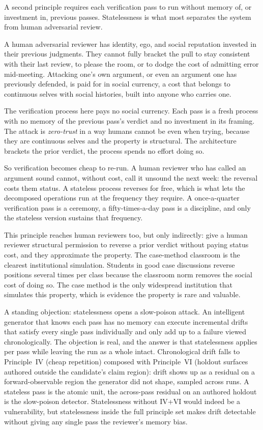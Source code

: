 \documentclass[
  11pt,
]{article}
\begin{document}
A second principle requires each verification pass to run without memory
of, or investment in, previous passes. Statelessness is what most
separates the system from human adversarial review.

A human adversarial reviewer has identity, ego, and social reputation
invested in their previous judgments. They cannot fully bracket the pull
to stay consistent with their last review, to please the room, or to
dodge the cost of admitting error mid-meeting. Attacking one's own
argument, or even an argument one has previously defended, is paid for
in social currency, a cost that belongs to continuous selves with social
histories, built into anyone who carries one.

The verification process here pays no social currency. Each pass is a
fresh process with no memory of the previous pass's verdict and no
investment in its framing. The attack is \emph{zero-trust} in a way humans
cannot be even when trying, because they are continuous selves and the
property is structural. The architecture brackets the prior verdict, the
process spends no effort doing so.

So verification becomes cheap to re-run. A human reviewer who has called
an argument sound cannot, without cost, call it unsound the next week: the
reversal costs them status. A stateless process reverses for free, which
is what lets the decomposed operations run at the frequency they require.
A once-a-quarter verification pass is a ceremony, a fifty-times-a-day pass
is a discipline, and only the stateless version sustains that
frequency.

This principle reaches human reviewers too, but only indirectly: give a
human reviewer structural permission to reverse a prior verdict without
paying status cost, and they approximate the property. The case-method
classroom is the clearest institutional simulation. Students in good case
discussions reverse positions several times per class because the
classroom norm removes the social cost of doing so. The case method is the
only widespread institution that simulates this property, which is
evidence the property is rare and valuable.

A standing objection: statelessness opens a slow-poison attack. An
intelligent generator that knows each pass has no memory can execute
incremental drifts that satisfy every single pass individually and only
add up to a failure viewed chronologically. The objection is real, and the
answer is that statelessness applies per pass while leaving the run as a
whole intact. Chronological drift falls to Principle~IV (cheap repetition)
composed with Principle~VI (holdout surfaces authored outside the
candidate's claim region): drift shows up as a residual on a
forward-observable region the generator did not shape, sampled across
runs. A stateless pass is the atomic unit, the across-pass residual on an
authored holdout is the slow-poison detector. Statelessness without IV+VI
would indeed be a vulnerability, but statelessness inside the full
principle set makes drift detectable without giving any single pass the
reviewer's memory bias.
\end{document}
